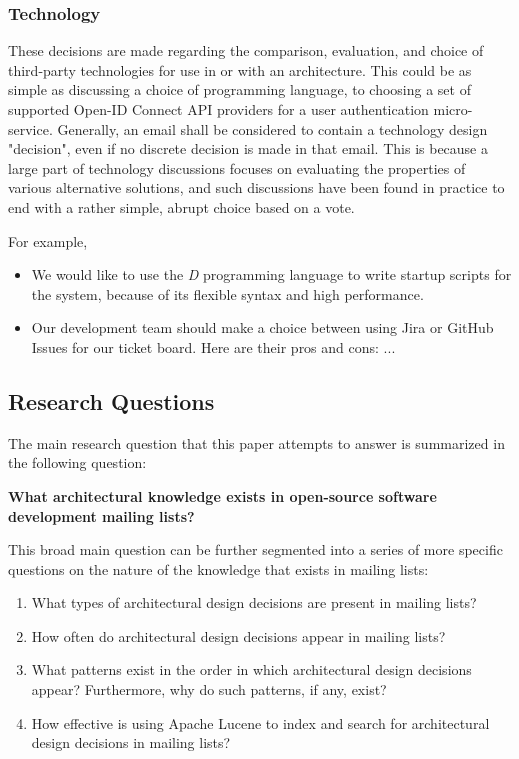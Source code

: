 \documentclass[a4paper, 12pt]{article}
\begin{document}
		\subsubsection{\textbf{Technology}}
			These decisions are made regarding the comparison, evaluation, and choice of third-party technologies for use in or with an architecture. This could be as simple as discussing a choice of programming language, to choosing a set of supported Open-ID Connect API providers for a user authentication micro-service. Generally, an email shall be considered to contain a technology design "decision", even if no discrete decision is made in that email. This is because a large part of technology discussions focuses on evaluating the properties of various alternative solutions, and such discussions have been found in practice to end with a rather simple, abrupt choice based on a vote.
			
			For example,
			\begin{itemize}
				\item We would like to use the \textit{D} programming language to write startup scripts for the system, because of its flexible syntax and high performance\cite{bright}.
				\item Our development team should make a choice between using Jira or GitHub Issues for our ticket board. Here are their pros and cons: ...
			\end{itemize}
		
	\newpage
	\subsection{Research Questions}
		\label{sec:research-questions}
		The main research question that this paper attempts to answer is summarized in the following question:
		
		\large \textbf{What architectural knowledge exists in open-source software development mailing lists?}
		\normalsize
		
		This broad main question can be further segmented into a series of more specific questions on the nature of the knowledge that exists in mailing lists:
		
		\begin{enumerate}
			\item What types of architectural design decisions are present in mailing lists?
			\item How often do architectural design decisions appear in mailing lists?
			\item What patterns exist in the order in which architectural design decisions appear? Furthermore, why do such patterns, if any, exist?
			\item How effective is using Apache Lucene to index and search for architectural design decisions in mailing lists?
		\end{enumerate}
	
\end{document}
